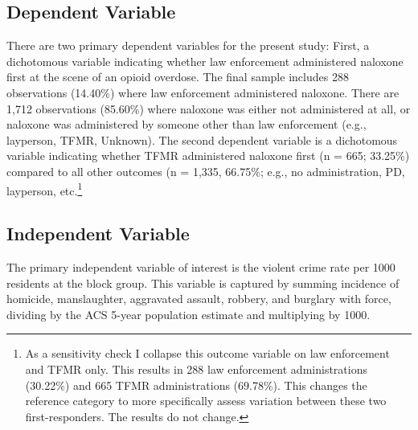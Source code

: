 \subsection{Dependent Variable}
There are two primary dependent variables for the present study: First, a dichotomous variable indicating whether law enforcement administered naloxone first at the scene of an opioid overdose. The final sample includes 288 observations (14.40\%) where law enforcement administered naloxone. There are 1,712 observations (85.60\%) where naloxone was either not administered at all, or naloxone was administered by someone other than law enforcement (e.g., layperson, TFMR, Unknown). The second dependent variable is a dichotomous variable indicating whether TFMR administered naloxone first (n = 665; 33.25\%) compared to all other outcomes (n = 1,335, 66.75\%; e.g., no administration, PD, layperson, etc.\footnote{As a sensitivity check I collapse this outcome variable on law enforcement and TFMR only. This results in 288 law enforcement administrations (30.22\%) and 665 TFMR administrations (69.78\%). This changes the reference category to more specifically assess variation between these two first-responders. The results do not change.}

\subsection{Independent Variable}
The primary independent variable of interest is the violent crime rate per 1000 residents at the block group. This variable is captured by summing incidence of homicide, manslaughter, aggravated assault, robbery, and burglary with force, dividing by the ACS 5-year population estimate and multiplying by 1000.

